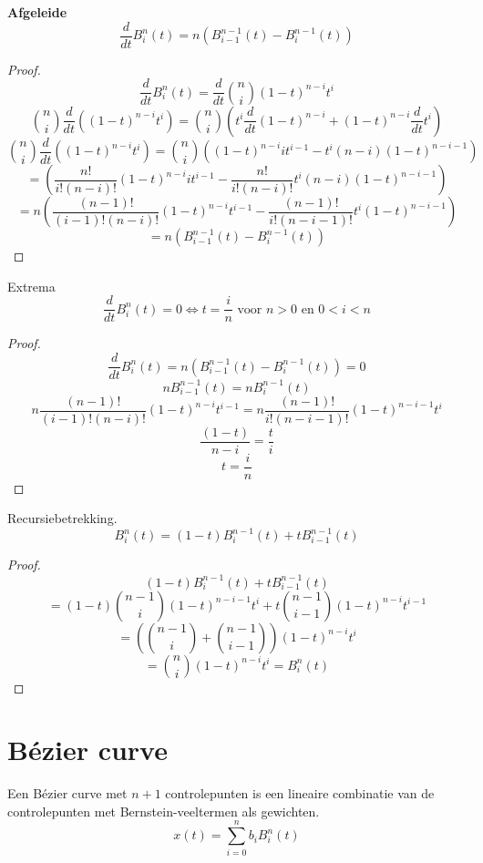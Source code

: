\documentclass[computergesteund_ontwerp_van_curven_en_oppervlakken.tex]{subfiles}
\begin{document}
\begin{ei}
\textbf{Afgeleide}
\label{bern_afgeleide}
\[
\frac{d}{dt}B_{i}^{n}(t) = n(B_{i-1}^{n-1}(t) - B_{i}^{n-1}(t))
\]
\begin{proof}
\[
\frac{d}{dt}B_{i}^{n}(t) = \frac{d}{dt}\binom{n}{i}(1-t)^{n-i}t^{i}
\]
\[
\binom{n}{i}\frac{d}{dt}\left((1-t)^{n-i}t^{i}\right)
= \binom{n}{i}
\left(
t^{i}\frac{d}{dt}(1-t)^{n-i}
+ (1-t)^{n-i}\frac{d}{dt}t^{i}
\right)
\]
\[
\binom{n}{i}\frac{d}{dt}\left((1-t)^{n-i}t^{i}\right)
= \binom{n}{i}
\left(
(1-t)^{n-i}it^{i-1}
-t^{i}(n-i)(1-t)^{n-i-1}
\right)
\]
\[
= 
\left(
\frac{n!}{i!(n-i)!}
(1-t)^{n-i}it^{i-1}
-
\frac{n!}{i!(n-i)!}
t^{i}(n-i)(1-t)^{n-i-1}
\right)
\]
\[
= 
n
\left(
\frac{(n-1)!}{(i-1)!(n-i)!}
(1-t)^{n-i}t^{i-1}
-
\frac{(n-1)!}{i!(n-i-1)!}
t^{i}(1-t)^{n-i-1}
\right)
\]
\[
 = n(B_{i-1}^{n-1}(t) - B_{i}^{n-1}(t))
\]
\end{proof}
\end{ei}
\begin{ei}
Extrema
\[
\frac{d}{dt}B_{i}^{n}(t) = 0 \Leftrightarrow t = \frac{i}{n} \text{ voor } n > 0 \text{ en } 0 < i < n
\]
\begin{proof}
\[
\frac{d}{dt}B_{i}^{n}(t) = n(B_{i-1}^{n-1}(t) - B_{i}^{n-1}(t)) = 0
\]
\[
nB_{i-1}^{n-1}(t) = nB_{i}^{n-1}(t)
\]
\[
n \frac{(n-1)!}{(i-1)!(n-i)!}
(1-t)^{n-i}t^{i-1}
=
n \frac{(n-1)!}{i!(n-i-1)!}
(1-t)^{n-i-1}t^{i}
\]
\[
\frac{(1-t)}{n-i}
=
\frac{t}{i}
\]
\[
t = \frac{i}{n}
\]
\end{proof}
\end{ei}
\begin{ei}
Recursiebetrekking.
\[
B_{i}^{n}(t) = (1-t)B^{n-1}_{i}(t) + tB^{n-1}_{i-1}(t)
\]
\begin{proof}
\[
(1-t)B^{n-1}_{i}(t) + tB^{n-1}_{i-1}(t)
\]
\[
= 
(1-t)\binom{n-1}{i}
(1-t)^{n-i-1}t^{i}
+
t\binom{n-1}{i-1}
(1-t)^{n-i}t^{i-1} 
\]
\[
= \left(\binom{n-1}{i}+\binom{n-1}{i-1}\right)
(1-t)^{n-i}t^{i}
\]
\[
=
\binom{n}{i}
(1-t)^{n-i}t^{i}
= B_{i}^{n}(t)
\]
\end{proof}
\end{ei}

\section{B\'ezier curve}
\begin{de}
Een B\'ezier curve met $n+1$ controlepunten is een lineaire combinatie van de controlepunten met Bernstein-veeltermen als gewichten.
\[
x(t) = \sum_{i=0}^nb_{i}B_{i}^{n}(t)
\]
\end{de}
\end{document}
